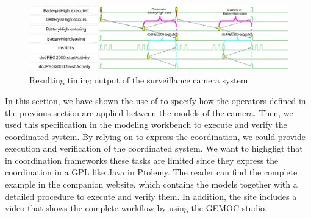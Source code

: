		\begin{figure}[h]
			\center
			\includegraphics[width=1\columnwidth]{examples/figs/vcdcamera}
			\caption{Resulting timing output of the surveillance camera system}
			\label{fig:camerasystem}
		\end{figure}
		
	
In this section, we have shown the use of \bflow to specify how the operators defined in the previous section are applied between the models of the camera. Then, we used this specification in the modeling workbench to execute and verify the coordinated system. By relying on \ccsl to express the coordination, we could provide execution and verification of the coordinated system. We want to highgligt that in coordination frameworks these tasks are limited since they express the coordination in a GPL like Java in Ptolemy. The reader can find the complete example in the companion website, which contains the models together with a detailed procedure to execute and verify them. In addition, the site includes a video that shows the complete workflow by using the GEMOC studio.



	
	
	